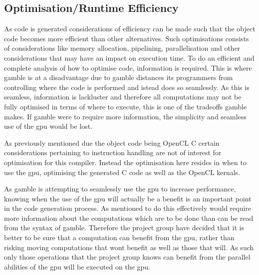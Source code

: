 \subsection*{Optimisation/Runtime Efficiency}
As code is generated considerations of efficiency can be made such that the object code becomes more efficient than other alternatives.
Such optimisations consists of considerations like memory allocation, pipelining, parallelisation and other considerations that may have an impact on execution time.
To do an efficient and complete analysis of how to optimise code, information is required.
This is where \gls{gamble} is at a disadvantage due to \gls{gamble} distances its programmers from controlling where the code is performed and istead does so seamlessly.
As this is seamless, information is lackluster and therefore all computations may not be fully optimised in terms of where to execute, this is one of the tradeoffs \gls{gamble} makes.
If \gls{gamble} were to require more information, the simplicity and seamless use of the \acrshort{gpu} would be lost.

As previously mentioned due the object code being OpenCL C certain considerations pertaining to instruction handling are not of interest for optimisation for this compiler.
Instead the optimisation here resides in when to use the \acrshort{gpu}, optimising the generated C code as well as the OpenCL kernals.

As \gls{gamble} is attempting to seamlessly use the \acrshort{gpu} to increase performance, knowing when the use of the \acrshort{gpu} will actually be a benefit is an important point in the code generation process.
As mentioned to do this effectively would require more information about the computations which are to be done than can be read from the syntax of \gls{gamble}.
Therefore the project group have decided that it is better to be sure that a computation can benefit from the \acrshort{gpu}, rather than risking moving computations that wont benefit as well as those that will.
As such only those operations that the project group knows can benefit from the parallel abilities of the \acrshort{gpu} will be executed on the \acrshort{gpu}.






